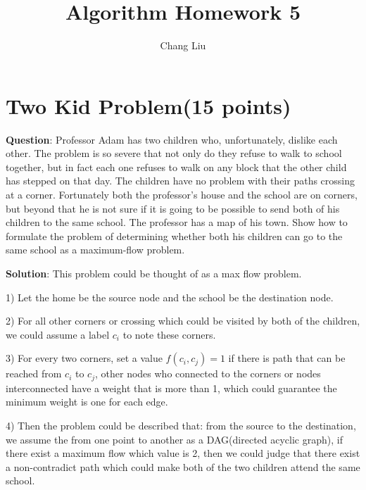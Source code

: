 \documentclass{article}
\title{Algorithm Homework 5}
\author{Chang Liu}
\begin{document}
\pagestyle{main}

\section{Two Kid Problem(15 points)}
\textbf{Question}: Professor Adam has two children who, unfortunately, dislike each other. The problem is so severe that not only do they refuse to walk to school together, but in fact each one refuses to walk on any block that the other child has stepped on that day. The children have no problem with their paths crossing at a corner. Fortunately both the professor’s house and the school are on corners, but beyond that he is not sure if it is going to be possible to send both of his children to the same school. The professor has a map of his town. Show how to formulate the problem of determining whether both his children can go to the same school as a maximum-flow problem.\newline


\textbf{Solution}: This problem could be thought of as a max flow problem.

1) Let the home be the source node and the school be the destination node.

2) For all other corners or crossing which could be visited by both of the children, we could assume a label $c_{i}$
to note these corners.

3) For every two corners, set a value $f(c_{i}, c_{j}) = 1$ if there is path that can be reached from $c_{i}$ to $c_{j}$, other nodes who connected to the corners or nodes interconnected have a weight that is more than 1, which could guarantee the minimum weight is one for each edge.

4) Then the problem could be described that: from the source to the destination, we assume the from one point to another
as a DAG(directed acyclic graph), if there exist a maximum flow which value is 2, then we could judge that there exist a
non-contradict path which could make both of the two children attend the same school.\newline
\end{document}
